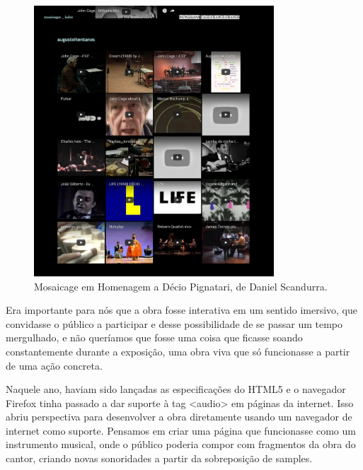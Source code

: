 \begin{figure}

\includegraphics[width=0.8\textwidth]{pictures/cap1/mosaicages}
\caption{Mosaicage em Homenagem a Décio Pignatari, de Daniel Scandurra.}
\label{fig:hp}
\end{figure}

Era importante para nós que a obra fosse interativa em um sentido imersivo, que convidasse o público a participar e desse possibilidade de se passar um tempo mergulhado, e não queríamos que fosse uma coisa que ficasse soando constantemente durante a exposição, uma obra viva que só funcionasse a partir de uma ação concreta. 

Naquele ano, haviam sido lançadas as especificações do HTML5 e o navegador Firefox tinha passado a dar suporte à tag <audio> em páginas da internet. Isso abriu perspectiva para desenvolver a obra diretamente usando um navegador de internet como suporte. Pensamos em criar uma página que funcionasse como um instrumento musical, onde o público poderia compor com fragmentos da obra do cantor, criando novas sonoridades a partir da sobreposição de samples. 

